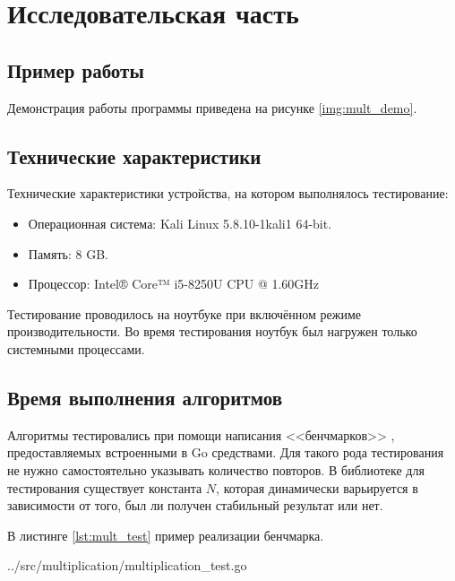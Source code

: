 \chapter{Исследовательская часть}

\section{Пример работы}

Демонстрация работы программы приведена на рисунке \ref{img:mult_demo}.


\section{Технические характеристики}

Технические характеристики устройства, на котором выполнялось тестирование:

\begin{itemize}
	\item Операционная система: Kali \cite{kali} Linux \cite{linux} 5.8.10-1kali1 64-bit.
	\item Память: 8 GB.
	\item Процессор: Intel® Core™ i5-8250U \cite{intel} CPU @ 1.60GHz
\end{itemize}

Тестирование проводилось на ноутбуке при включённом режиме производительности. Во время тестирования ноутбук был нагружен только системными процессами.

\section{Время выполнения алгоритмов}

Алгоритмы тестировались при помощи написания <<бенчмарков>> \cite{gotest}, предоставляемых встроенными в Go средствами. Для такого рода тестирования не нужно самостоятельно указывать количество повторов. В библиотеке для тестирования существует константа $N$, которая динамически варьируется в зависимости от того, был ли получен стабильный результат или нет.

В листинге \ref{lst:mult_test} пример реализации бенчмарка.

\begin{lstinputlisting}[
	caption={Реализация бенчмарка},
	label={lst:mult_test},
	style={go},
	linerange={1-17},
	]{../src/multiplication/multiplication_test.go}
\end{lstinputlisting}

